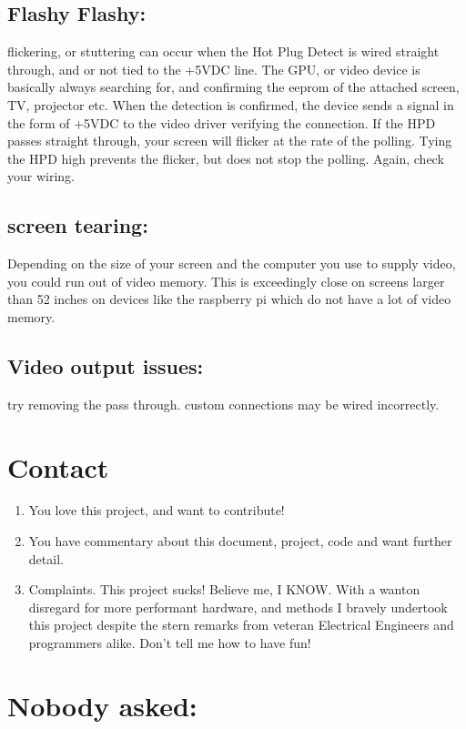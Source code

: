 \documentclass[]{article}
\begin{document}
\subsection{Flashy Flashy:} flickering, or stuttering can occur when the Hot Plug Detect is wired straight through, and or not tied to the +5VDC line. The GPU, or video device is basically always searching for, and confirming the eeprom of the attached screen, TV, projector etc. When the detection is confirmed, the device sends a signal in the form of +5VDC to the video driver verifying the connection. If the HPD passes straight through, your screen will flicker at the rate of the polling. Tying the HPD high prevents the flicker, but does not stop the polling. Again, check your wiring.
\subsection{screen tearing:} Depending on the size of your screen and the computer you use to supply video, you could run out of video memory. This is exceedingly close on screens larger than 52 inches on devices like the raspberry pi which do not have a lot of video memory.
\subsection{Video output issues:} try removing the pass through. custom connections may be wired incorrectly. \\

\section*{Contact}
\begin{enumerate}
\item You love this project, and want to contribute!
\item You have commentary about this document, project, code and want further detail.
\item Complaints. This project sucks! Believe me, I KNOW. With a wanton disregard for more performant hardware, and methods I bravely undertook this project despite the stern remarks from veteran Electrical Engineers and programmers alike. Don't tell me how to have fun!
\end{enumerate}





\section*{Nobody asked:}
\end{document}
